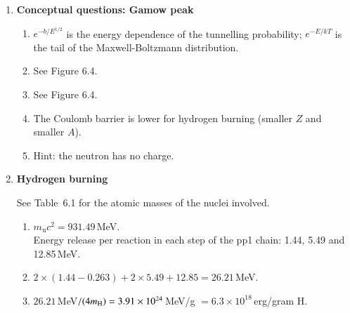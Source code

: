 \documentclass[11pt,a4paper]{report}
\begin{document}

\begin{enumerate}


\item {\bf Conceptual questions: Gamow peak} 

  \begin{enumerate}
  \item $e^{-b/E^{1/2}}$ is the energy dependence of the tunnelling
    probability; $e^{-E/kT}$ is the tail of the Maxwell-Boltzmann
    distribution.

  \item See Figure 6.4.

  \item See Figure 6.4.

  \item The Coulomb barrier is lower for hydrogen burning (smaller $Z$ and
    smaller $A$).

  \item Hint: the neutron has no charge.

\end{enumerate}


\item{\bf Hydrogen burning}

  See Table~6.1 for the atomic masses of the nuclei involved.
  \begin{enumerate}
  \item $m_\mathrm{u} c^2 = 931.49$\,MeV. \\
    Energy release per reaction in each step of the pp1 chain: 1.44,
    5.49 and 12.85\,MeV.

  \item $2\times(1.44 - 0.263) + 2\times 5.49 + 12.85 = 26.21$\,MeV.

  \item $26.21$\,MeV$/(4m_{\rm H}) = 3.91\times10^{24}$\,MeV/g $=
    6.3\times10^{18}$\,erg/gram H.

  \end{enumerate}




\end{enumerate}
\end{document}
